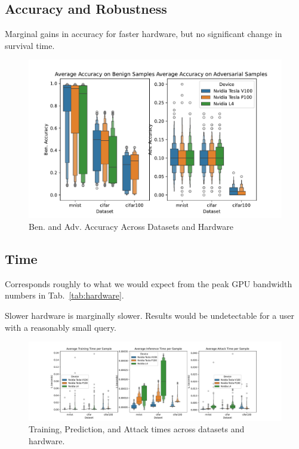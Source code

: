 \documentclass[conference]{IEEEtran}
\begin{document}
\subsection{Accuracy and Robustness}
Marginal gains in accuracy for faster hardware, but no significant change in survival time.
\begin{figure}
    \centering
    \includegraphics[width=\textwidth]{plots/combined/acc.pdf}
    \caption{Ben. and Adv. Accuracy Across Datasets and Hardware}
    \label{fig:acc}
\end{figure}

\subsection{Time}
Corresponds roughly to what we would expect from the peak GPU bandwidth numbers in Tab.~\ref{tab:hardware}.

Slower hardware is marginally slower. Results would be undetectable for a user with a reasonably small query.


\begin{figure}
    \centering
    \includegraphics[width=\textwidth]{plots/combined/time.pdf}
    \caption{Training, Prediction, and Attack times across datasets and hardware.}
    \label{fig:time}
\end{figure}
\end{document}
